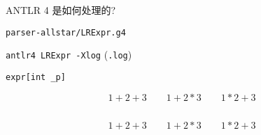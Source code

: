 
\begin{frame}{}
  \begin{center}
    \Large{ANTLR 4 是如何处理的?}
  \end{center}
\end{frame}

\begin{frame}{}
  \begin{center}
    \texttt{parser-allstar/LRExpr.g4}

    \vspace{0.30cm}

    \pause
    \vspace{0.80cm}
    \texttt{antlr4 LRExpr -Xlog} \qquad (\texttt{.log})
  \end{center}
\end{frame}

\begin{frame}{}
  \begin{center}

  \pause
  \end{center}
\end{frame}

\begin{frame}{}

  \begin{center}
	\texttt{expr[int \_p]}
  \end{center}

\end{frame}

\begin{frame}{}
  \begin{center}
  \end{center}


  \[
    1 + 2 + 3 \qquad 1 + 2 \ast 3 \qquad 1 * 2 + 3
  \]
\end{frame}

\begin{frame}{}
  \begin{columns}
      
  \end{columns}

  \vspace{0.50cm}
  \[
    1 + 2 + 3 \qquad 1 + 2 \ast 3 \qquad 1 * 2 + 3
  \]
\end{frame}

